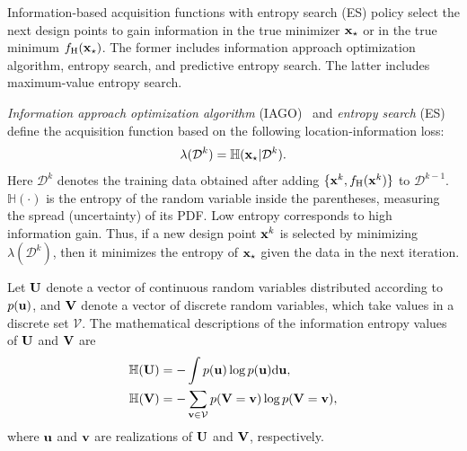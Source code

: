 \documentclass[journal ]{new-aiaa}
\begin{document}
Information-based acquisition functions with entropy search (ES) policy select the next design points to gain information in the true minimizer ${\bf x}_\star$ or in the true minimum $f_\text{H}({\bf x}_\star)$.
The former includes information approach optimization algorithm, entropy search, and predictive entropy search.
The latter includes maximum-value entropy search.

\textit{Information approach optimization algorithm} (IAGO)~\citep{Villemonteix2009} and \textit{entropy search} (ES)~\citep{Hennig2012} define the acquisition function based on the following location-information loss:
\begin{equation}\label{eqn43}
	\lambda(\mathcal{D}^{k}) = \mathbb{H}({\bf x}_\star|\mathcal{D}^{k}).
\end{equation}
Here $\mathcal{D}^{k}$ denotes the training data obtained after adding $\{{\bf x}^k,f_\text{H}({\bf x}^k)\}$ to $\mathcal{D}^{k-1}$.
$\mathbb{H}(\cdot)$ is the entropy of the random variable inside the parentheses, measuring the spread (uncertainty) of its PDF.
Low entropy corresponds to high information gain.
Thus, if a new design point ${\bf x}^k$ is selected by minimizing $\lambda(\mathcal{D}^{k})$, then it minimizes the entropy of ${\bf x}_\star$ given the data in the next iteration. 

Let ${\bf U}$ denote a vector of continuous random variables distributed according to $p({\bf u})$, and ${\bf V}$ denote a vector of discrete random variables, which take values in a discrete set $\mathcal{V}$.
The mathematical descriptions of the information entropy values of ${\bf U}$ and ${\bf V}$ are 
\begin{subequations}\label{eqn44}
	\begin{align}
		\mathbb{H}({\bf U})& =-\int p({\bf u}) \log{p({\bf u})} \text{d}{\bf u}
		\label{eqn44-1},\\
		\mathbb{H}({\bf V}) & = -\sum_{{\bf v} \in \mathcal{V}}p({\bf V}={\bf v}) \log{p({\bf V}={\bf v})}
		\label{eqn44-2},
	\end{align}
\end{subequations}
where ${\bf u}$ and ${\bf v}$ are realizations of ${\bf U}$ and ${\bf V}$, respectively.
\end{document}
